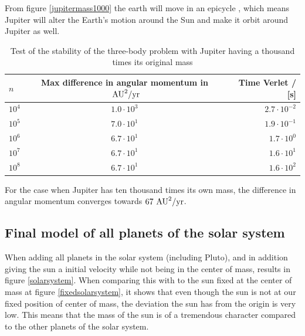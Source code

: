 \documentclass{article}
\begin{document}
From figure \ref{jupitermass1000} the earth will move in an epicycle \cite{epicycle}, which means Jupiter will alter the Earth's motion around the Sun and make it orbit around Jupiter as well.



\begin{table}[H]
    \centering
    \begin{tabular}{|l|c|r|}
    \hline
     $n$ & Max difference in angular momentum in ${\textnormal{ AU}}^2\textnormal{/yr}$ & Time Verlet / [s] \\
     \hline
      $10^4$  & $1.0\cdot10^{3}$  & $2.7\cdot10^{-2}$\\
      $10^5$  & $7.0\cdot10^{1}$  & $1.9\cdot10^{-1}$ \\
      $10^6$  & $6.7\cdot10^{1}$  & $1.7\cdot10^{0}$\\
      $10^7$  & $6.7\cdot10^{1}$  & $1.6\cdot10^{1}$\\
      $10^8$  & $6.7\cdot10^{1}$  & $1.6\cdot10^{2}$\\
      \hline
    \end{tabular}
    \caption{Test of the stability of the three-body problem with Jupiter having a thousand times its original mass}
    \label{Three-body-problem-jupiter}
\end{table}

For the case when Jupiter has ten thousand times its own mass, the difference in angular momentum converges towards $67 {\textnormal{ AU}}^2\textnormal{/yr}$.


\subsection{Final model of all planets of the solar system}
When adding all planets in the solar system (including Pluto), and in addition giving the sun a initial velocity while not being in the center of mass, results in figure \ref{solarsystem}. When comparing this with to the sun fixed at the center of mass at figure \ref{fixedsolarsystem}, it shows that even though the sun is not at our fixed position of center of mass, the deviation the sun has from the origin is very low. This means that the mass of the sun is of a tremendous character compared to the other planets of the solar system.
\end{document}
